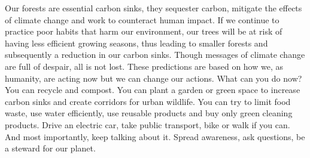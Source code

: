 \documentclass{article}\usepackage[]{graphicx}\usepackage[]{color}
\begin{document}
Our forests are essential carbon sinks, they sequester carbon, mitigate the effects of climate change and work to counteract human impact. If we continue to practice poor habits that harm our environment, our trees will be at risk of having less efficient growing seasons, thus leading to smaller forests and subsequently a reduction in our carbon sinks. Though messages of climate change are full of despair, all is not lost. These predictions are based on how we, as humanity, are acting now but we can change our actions. What can you do now? You can recycle and compost. You can plant a garden or green space to increase carbon sinks and create corridors for urban wildlife. You can try to limit food waste, use water efficiently, use reusable products and buy only green cleaning products. Drive an electric car, take public transport, bike or walk if you can. And most importantly, keep talking about it. Spread awareness, ask questions, be a steward for our planet.
\end{document}
